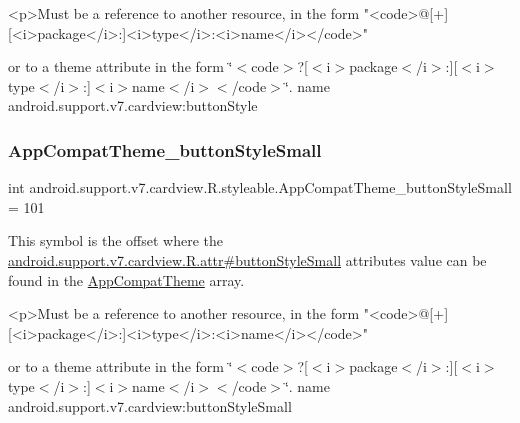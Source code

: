 \begin{DoxyVerb}      <p>Must be a reference to another resource, in the form "<code>@[+][<i>package</i>:]<i>type</i>:<i>name</i></code>"
\end{DoxyVerb}
 or to a theme attribute in the form \char`\"{}$<$code$>$?\mbox{[}$<$i$>$package$<$/i$>$\+:\mbox{]}\mbox{[}$<$i$>$type$<$/i$>$\+:\mbox{]}$<$i$>$name$<$/i$>$$<$/code$>$\char`\"{}.  name android.\+support.\+v7.\+cardview\+:button\+Style \mbox{\label{classandroid_1_1support_1_1v7_1_1cardview_1_1R_1_1styleable_a575b1d9c7fa1adee560df29f9326b54b}} 
\subsubsection{\texorpdfstring{App\+Compat\+Theme\+\_\+button\+Style\+Small}{AppCompatTheme\_buttonStyleSmall}}
{\footnotesize\ttfamily int android.\+support.\+v7.\+cardview.\+R.\+styleable.\+App\+Compat\+Theme\+\_\+button\+Style\+Small = 101\hspace{0.3cm}{\ttfamily [static]}}

This symbol is the offset where the \hyperlink{classandroid_1_1support_1_1v7_1_1cardview_1_1R_1_1attr_aee51161a62b9b1906e052f4465a89580}{android.\+support.\+v7.\+cardview.\+R.\+attr\#button\+Style\+Small} attribute\textquotesingle{}s value can be found in the \hyperlink{classandroid_1_1support_1_1v7_1_1cardview_1_1R_1_1styleable_a52e6f69f954ecc2622d72c0b4d298938}{App\+Compat\+Theme} array.

\begin{DoxyVerb}      <p>Must be a reference to another resource, in the form "<code>@[+][<i>package</i>:]<i>type</i>:<i>name</i></code>"
\end{DoxyVerb}
 or to a theme attribute in the form \char`\"{}$<$code$>$?\mbox{[}$<$i$>$package$<$/i$>$\+:\mbox{]}\mbox{[}$<$i$>$type$<$/i$>$\+:\mbox{]}$<$i$>$name$<$/i$>$$<$/code$>$\char`\"{}.  name android.\+support.\+v7.\+cardview\+:button\+Style\+Small \mbox{\label{classandroid_1_1support_1_1v7_1_1cardview_1_1R_1_1styleable_a1297109594ea429301e0fdfe894a1d4a}} 

